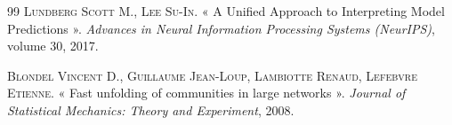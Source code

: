 \begin{thebibliography}{99}
\textsc{Lundberg Scott M., Lee Su-In}. « A Unified Approach to Interpreting Model Predictions ». \textit{Advances in Neural Information Processing Systems (NeurIPS)}, volume 30, 2017.

\textsc{Blondel Vincent D., Guillaume Jean-Loup, Lambiotte Renaud, Lefebvre Etienne}. « Fast unfolding of communities in large networks ». \textit{Journal of Statistical Mechanics: Theory and Experiment}, 2008.

\end{thebibliography}